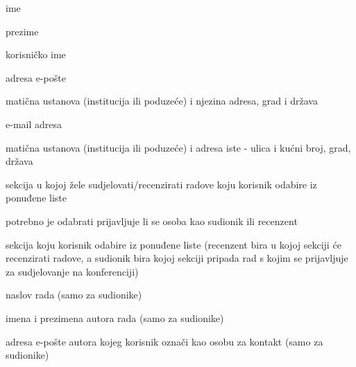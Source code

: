 		\begin{packed_item}

			\item ime
			\item prezime
			\item korisničko ime
			\item adresa e-pošte
			\item matična ustanova (institucija ili poduzeće) i njezina adresa, grad i država

			\item e-mail adresa
			\item matična ustanova (institucija ili poduzeće) i adresa iste - ulica i kućni broj, grad, država
			\item sekcija u kojoj žele sudjelovati/recenzirati radove koju korisnik odabire iz ponuđene liste

			\item potrebno je odabrati prijavljuje li se osoba kao sudionik ili recenzent
			\item sekcija koju korisnik odabire iz ponuđene liste (recenzent bira u kojoj sekciji će recenzirati radove, a sudionik bira kojoj sekciji pripada rad s kojim se prijavljuje za sudjelovanje na konferenciji)
			\item naslov rada (samo za sudionike)

			\item imena i prezimena autora rada (samo za sudionike)
			\item adresa e-pošte autora kojeg korisnik označi kao osobu za kontakt (samo za sudionike)

		
		\end{packed_item}
	
